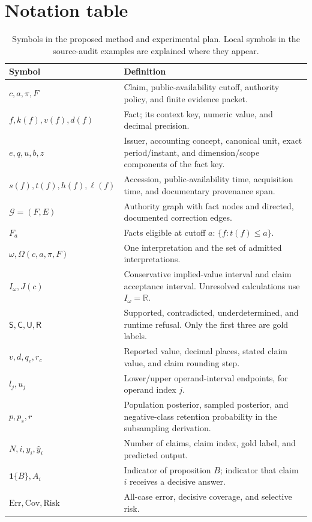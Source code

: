 \documentclass[11pt,a4paper]{article}
\newcommand{\ind}{\mathbf{1}}
\newcommand{\Slabel}{\mathsf{S}}
\newcommand{\Clabel}{\mathsf{C}}
\newcommand{\Ulabel}{\mathsf{U}}
\newcommand{\Rlabel}{\mathsf{R}}
\begin{document}
\section{Notation table}
\begin{table}[H]\caption{Symbols in the proposed method and experimental plan. Local symbols in the source-audit examples are explained where they appear.}
\small\begin{tabularx}{\linewidth}{p{.24\linewidth}Y}\toprule
Symbol & Definition\\\midrule
$c,a,\pi,F$ & Claim, public-availability cutoff, authority policy, and finite evidence packet.\\
$f,k(f),v(f),d(f)$ & Fact; its context key, numeric value, and decimal precision.\\
$e,q,u,b,z$ & Issuer, accounting concept, canonical unit, exact period/instant, and dimension/scope components of the fact key.\\
$s(f),t(f),h(f),\ell(f)$ & Accession, public-availability time, acquisition time, and documentary provenance span.\\
$\mathcal G=(F,E)$ & Authority graph with fact nodes and directed, documented correction edges.\\
$F_a$ & Facts eligible at cutoff $a$: $\{f:t(f)\le a\}$.\\
$\omega,\Omega(c,a,\pi,F)$ & One interpretation and the set of admitted interpretations.\\
$I_\omega,J(c)$ & Conservative implied-value interval and claim acceptance interval. Unresolved calculations use $I_\omega=\mathbb R$.\\
$\Slabel,\Clabel,\Ulabel,\Rlabel$ & Supported, contradicted, underdetermined, and runtime refusal. Only the first three are gold labels.\\
$v,d,q_c,r_c$ & Reported value, decimal places, stated claim value, and claim rounding step.\\
$l_j,u_j$ & Lower/upper operand-interval endpoints, for operand index $j$.\\
$p,p_s,r$ & Population posterior, sampled posterior, and negative-class retention probability in the subsampling derivation.\\
$N,i,y_i,\hat y_i$ & Number of claims, claim index, gold label, and predicted output.\\
$\ind\{B\},A_i$ & Indicator of proposition $B$; indicator that claim $i$ receives a decisive answer.\\
$\mathrm{Err},\mathrm{Cov},\mathrm{Risk}$ & All-case error, decisive coverage, and selective risk.\\

\end{tabularx}
\end{table}
\end{document}
